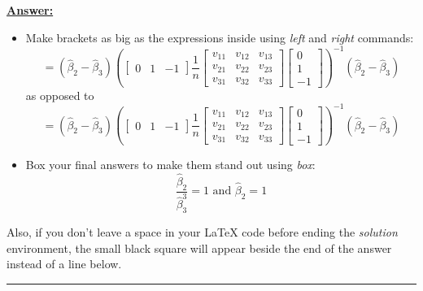 \documentclass{article} %
\newenvironment{solution}[1][Answer]{\begin{singlespace}\underline{\textbf{#1:}}\quad }{\ \rule{0.3em}{0.3em}\end{singlespace}} %
\begin{document}
\begin{solution}
\begin{itemize}
    \item Make brackets as big as the expressions inside using \textit{left} and \textit{right} commands:
    $$  = (\hat{\beta}_2 - \hat{\beta}_3) \left(\begin{bmatrix} 
    0 & 1 & -1
    \end{bmatrix} \frac{1}{n} \begin{bmatrix} 
    v_{11} & v_{12} &v_{13} \\v_{21} & v_{22} &v_{23} \\ v_{31} & v_{32} & v_{33}
    \end{bmatrix} \begin{bmatrix} 
    0 \\ 1 \\ -1
    \end{bmatrix}\right)^{-1} (\hat{\beta}_2 - \hat{\beta}_3) $$
    as opposed to 
    $$  = (\hat{\beta}_2 - \hat{\beta}_3) (\begin{bmatrix} 
    0 & 1 & -1
    \end{bmatrix} \frac{1}{n} \begin{bmatrix} 
    v_{11} & v_{12} &v_{13} \\v_{21} & v_{22} &v_{23} \\ v_{31} & v_{32} & v_{33}
    \end{bmatrix} \begin{bmatrix} 
    0 \\ 1 \\ -1
    \end{bmatrix})^{-1} (\hat{\beta}_2 - \hat{\beta}_3) $$
    
    \item Box your final answers to make them stand out using \textit{box}:
    $$ \boxed{\frac{\hat{\beta}_2}{\hat{\beta}_3^3} = 1 \text{ and } \hat{\beta}_2 = 1} $$
    
\end{itemize}

Also, if you don't leave a space in your \LaTeX{} code before ending the \textit{solution} environment, the small black square will appear beside the end of the answer instead of a line below.
\end{solution}
\end{document}
